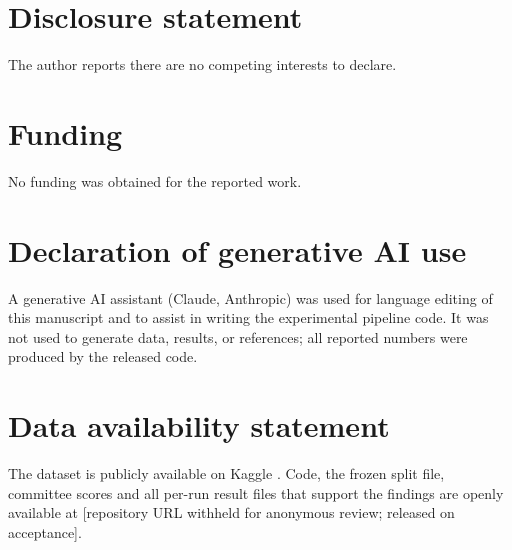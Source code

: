 \documentclass[11pt]{article}
\newcommand{\repourl}{[repository URL withheld for anonymous review; released on acceptance]}
\newcommand{\repourl}{\url{https://github.com/hz6yc3/attention-enhanced-unet-segmentation}}
\begin{document}
\section*{Disclosure statement}
The author reports there are no competing interests to declare.

\section*{Funding}
No funding was obtained for the reported work.

\section*{Declaration of generative AI use}
A generative AI assistant (Claude, Anthropic) was used for language editing of this manuscript and to assist in writing the experimental pipeline code. It was not used to generate data, results, or references; all reported numbers were produced by the released code.

\section*{Data availability statement}
The dataset is publicly available on Kaggle \citep{sanadalali}. Code, the frozen split file, committee scores and all per-run result files that support the findings are openly available at \repourl.
\end{document}
